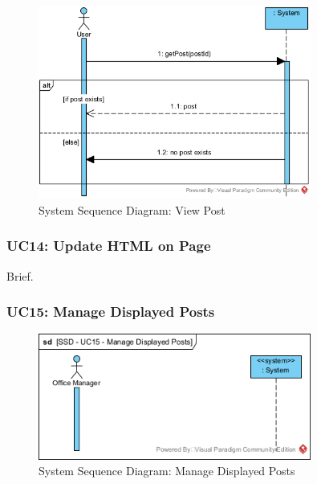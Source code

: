 \documentclass{article}
\begin{document}
\begin{figure}[H]
    \centering
    \includegraphics[width=0.8\textwidth]{images/SSD-UC13-ViewPost.png}
    \centering
    \caption{System Sequence Diagram: View Post}
\end{figure}
\subsubsection{UC14: Update HTML on Page}
Brief.
\subsubsection{UC15: Manage Displayed Posts}
\begin{figure}[H]
    \centering
    \includegraphics[width=0.8\textwidth]{images/SSD-UC15-ManageDisplayedPosts.png}
    \centering
    \caption{System Sequence Diagram: Manage Displayed Posts}
\end{figure}
\end{document}
